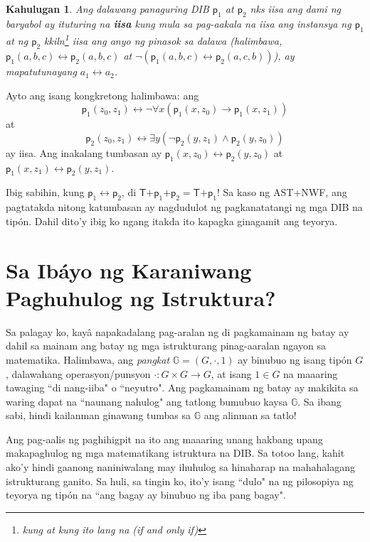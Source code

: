 \documentclass{article}
\newtheorem{definition}{Kahulugan}[section]
\begin{document}
\begin{definition}
\label{tumbasan}
Ang dalawang panaguring DIB $\textsf{p}_1$ at $\textsf{p}_2$ nks iisa ang dami ng baryabol ay ituturing na \textbf{iisa} kung mula sa pag-aakala na iisa ang instansya ng $\textsf{p}_1$ at ng $\textsf{p}_2$ kkiln\footnote{kung at kung ito lang na (if and only if)} iisa ang anyo ng pinasok sa dalawa (halimbawa, $\textsf{p}_1(a, b, c) \leftrightarrow \textsf{p}_2(a, b, c)$ at $\neg(\textsf{p}_1(a, b, c) \leftrightarrow \textsf{p}_2(a, c, b))$), ay mapatutunayang $a_1 \leftrightarrow a_2$.
\end{definition}

Ayto ang isang kongkretong halimbawa: ang $$\textsf{p}_1(z_0, z_1) \leftrightarrow \neg\forall x(\textsf{p}_1(x, z_0) \rightarrow \textsf{p}_1(x, z_1))$$ at $$\textsf{p}_2(z_0, z_1) \leftrightarrow \exists y(\neg \textsf{p}_2(y, z_1) \wedge \textsf{p}_2(y, z_0))$$ ay iisa. Ang inakalang tumbasan ay $\textsf{p}_1(x, z_0) \leftrightarrow \textsf{p}_2(y, z_0)$ at $\textsf{p}_1(x, z_1) \leftrightarrow \textsf{p}_2(y, z_1)$.

Ibig sabihin, kung $\textsf{p}_1 \leftrightarrow \textsf{p}_2$, di $\textsf{T+}\textsf{p}_1\textsf{+p}_2 = \textsf{T+}\textsf{p}_1$! Sa kaso ng \textsf{AST+NWF}, ang pagtatakda nitong katumbasan ay nagdudulot ng pagkanatatangi ng mga DIB na tipón. Dahil dito'y ibig ko ngang itakda ito kapagka ginagamit ang teyorya.  

\section{Sa Ibáyo ng Karaniwang Paghuhulog ng Istruktura?}

Sa palagay ko, kayâ napakadalang pag-aralan ng di pagkamainam ng batay ay dahil sa mainam ang batay ng mga istrukturang pinag-aaralan ngayon sa matematika. Halimbawa, ang \textit{pangkat} $\mathbb{G} = (G, \cdot, 1)$ ay binubuo ng isang tipón $G$, dalawahang operasyon/punsyon $\cdot:G \times G \rightarrow G$, at isang $1 \in G$ na maaaring tawaging ``di nang-iiba" o ``neyutro". Ang pagkamainam ng batay ay makikita sa waring dapat na ``naunang nahulog" ang tatlong bumubuo kaysa $\mathbb{G}$. Sa ibang sabi, hindi kailanman ginawang tumbas sa $\mathbb{G}$ ang alinman sa tatlo!

Ang pag-aalis ng paghihigpit na ito ang maaaring unang hakbang upang makapaghulog ng mga matematikang istruktura na DIB. Sa totoo lang, kahit ako'y hindi gaanong naniniwalang may ihuhulog sa hinaharap na mahahalagang istrukturang ganito. Sa huli, sa tingin ko, ito'y isang ``dulo" na ng pilosopiya ng teyorya ng tipón na ``ang bagay ay binubuo ng iba pang bagay". 



\end{document}
